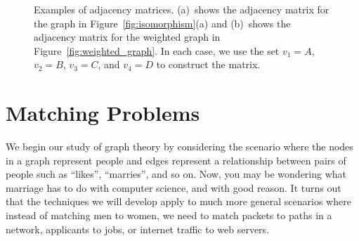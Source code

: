 \begin{figure}[h]

\qquad
{}

\caption{Examples of adjacency matrices.  (a)~shows the adjacency
  matrix for the graph in Figure~\ref{fig:isomorphism}(a) and
  (b)~shows the adjacency matrix for the weighted graph in
  Figure~\ref{fig:weighted_graph}.  In each case, we use the set $v_1
  = A$, $v_2 = B$, $v_3 = C$, and $v_4 = D$ to construct the matrix.}
\label{fig:adjacency_matrix}
\end{figure}

\begin{problems}
\classproblems
{}

\homeworkproblems
{}

\examproblems
{}
\end{problems}


\section{Matching Problems}\label{sexam}

We begin our study of graph theory by considering the scenario where
the nodes in a graph represent people and edges represent a
relationship between pairs of people such as ``likes'', ``marries'',
and so on.  Now, you may be wondering what marriage has to do with
computer science, and with good reason.  It turns out that the
techniques we will develop apply to much more general scenarios where
instead of matching men to women, we need to match packets to paths in
a network, applicants to jobs, or internet traffic to web servers.

